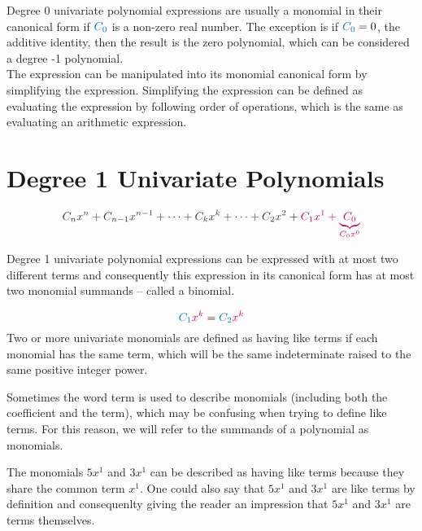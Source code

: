 \documentclass[20150903-160354-rs2.2-MarksMathNotebook.tex]{subfiles}
\begin{document}
Degree 0 univariate polynomial expressions are usually a monomial in their canonical form if $\cBlue{C_{0}}$ is a non-zero real number.  The exception is if $\cBlue{C_{0}}=0$, the additive identity, then the result is the zero polynomial, which can be considered a degree -1 polynomial.\\

The expression can be manipulated into its monomial canonical form by simplifying the expression.  Simplifying the expression can be defined as evaluating the expression by following order of operations, which is the same as evaluating an arithmetic expression.


\section{Degree 1 Univariate Polynomials}

\[
\cDarkGrey{C_{n}x^{n}+C_{n-1}x^{n-1}+ \cdots + C_{k}x^{k} + \cdots + C_{2}x^{2}}+\cRed{C_{1}x^{1}+\underbrace{C_{0}}_{C_{0}x^{0}}}
\]

Degree 1 univariate polynomial expressions can be expressed with at most two different terms and consequently this expression in its canonical form has at most two monomial summands -- called a binomial.

\begin{definition}

\[
\cBlue{C_{1}}\cRed{x^{k}} = \cBlue{C_{2}}\cRed{x^{k}}
\]
Two or more univariate monomials are defined as having like terms if each monomial has the same term, which will be the same indeterminate raised to the same positive integer power.
\end{definition}

Sometimes the word \alert{term} is used to describe monomials (including both the coefficient and the term), which may be confusing when trying to define like terms.  For this reason, we will refer to the summands of a polynomial as monomials.

The monomials $5x^1$ and $3x^1$ can be described as having like terms because they share the common term $x^1$.  One could also say that $5x^1$ and $3x^1$ are like terms by definition and consequenlty giving the reader an impression that $5x^1$ and $3x^1$ are terms themselves.
\end{document}
